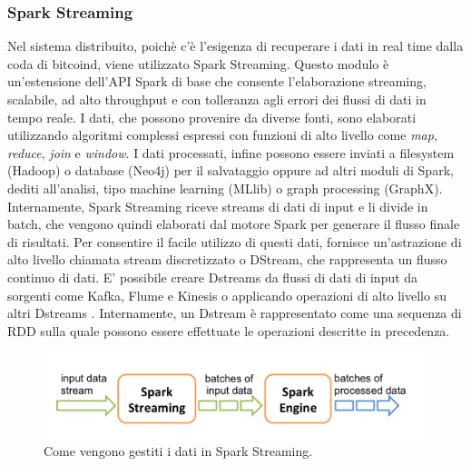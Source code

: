\subsubsection{Spark Streaming}
\label{sub:spark streaming}
Nel sistema distribuito, poichè c'è l'esigenza di recuperare i dati in real time dalla coda di bitcoind, viene utilizzato Spark Streaming. Questo modulo è un'estensione dell'API Spark di base che consente l'elaborazione streaming, scalabile, ad alto throughput e con tolleranza agli errori dei flussi di dati in tempo reale. I dati, che possono provenire da diverse fonti, sono elaborati utilizzando algoritmi complessi espressi con funzioni di alto livello come \textit{map}, \textit{reduce}, \textit{join} e \textit{window}. I dati processati, infine possono essere inviati a filesystem (Hadoop) o database (Neo4j) per il salvataggio oppure ad altri moduli di Spark, dediti all'analisi, tipo machine learning (MLlib) o graph processing (GraphX). 
\\Internamente, Spark Streaming riceve streams di dati di input e li divide in batch, che vengono quindi elaborati dal motore Spark per generare il flusso finale di risultati. Per consentire il facile utilizzo di questi dati, fornisce un'astrazione di alto livello chiamata stream discretizzato o DStream, che rappresenta un flusso continuo di dati. E' possibile creare Dstreams da flussi di dati di input da sorgenti come Kafka, Flume e Kinesis o applicando operazioni di alto livello su altri Dstreams \cite{spark:home-streaming}. Internamente, un Dstream è rappresentato come una sequenza di RDD sulla quale possono essere effettuate le operazioni descritte in precedenza.
\begin{figure}[H]
	\centering
	\includegraphics[width=\textwidth]{images/streamingSpark.png}
	\caption{Come vengono gestiti i dati in Spark Streaming.}
	\label{fig:streamingSpark}
\end{figure}
